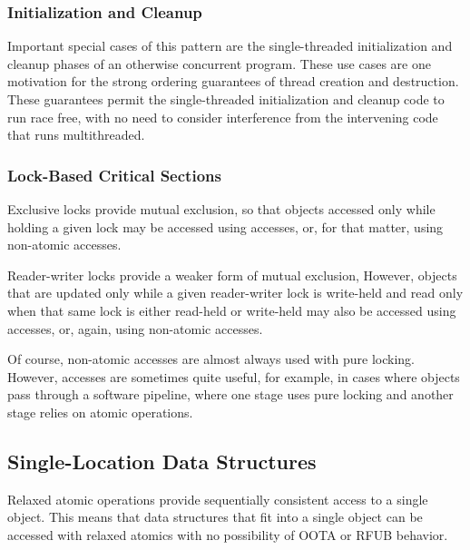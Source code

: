 \documentclass[10]{article}
\begin{document}
\subsubsection{Initialization and Cleanup}
\label{sec:Initialization and Cleanup}

Important special cases of this pattern are the single-threaded
initialization and cleanup phases of an otherwise concurrent program.
These use cases are one motivation for the strong ordering guarantees
of thread creation and destruction.
These guarantees permit the single-threaded initialization and cleanup
code to run race free, with no need to consider interference from the
intervening code that runs multithreaded.

\subsubsection{Lock-Based Critical Sections}
\label{sec:Lock-Based Critical Sections}

Exclusive locks provide mutual exclusion, so that objects accessed
only while holding a given lock may be accessed using
 accesses, or, for that matter, using
non-atomic accesses.

Reader-writer locks provide a weaker form of mutual exclusion,
However, objects that are updated only while a given reader-writer
lock is write-held and read only when that same lock is either
read-held or write-held may also be accessed using
 accesses, or, again, using non-atomic accesses.

Of course, non-atomic accesses are almost always used with pure locking.
However,  accesses are sometimes quite useful,
for example, in cases where objects pass through a software pipeline,
where one stage uses pure locking and another stage relies on atomic
operations.


\subsection{Single-Location Data Structures}
\label{sec:Single-Location Data Structures}

Relaxed atomic operations provide sequentially consistent access to
a single object.
This means that data structures that fit into a single object can
be accessed with relaxed atomics with no possibility of OOTA or
RFUB behavior.
\end{document}
